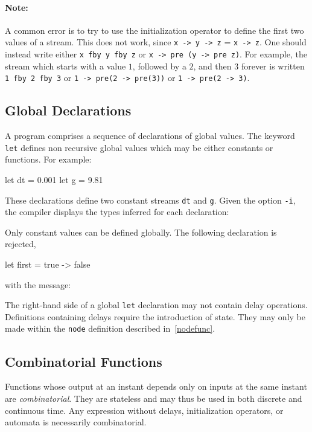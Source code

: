 \documentclass[11pt,titlepage,twoside]{report}
\newcommand{\zls}[1]{\texttt{#1}}
\newenvironment{sample}
  {\begin{flushright}\begin{minipage}[t]{15.3cm}\begin{alltt}\small}
  {\end{alltt}\end{minipage}\end{flushright}}
\begin{document}
\paragraph{Note:} A common error is to try to use the initialization 
operator to define the first two values of a
stream. This does not work, since \zls{x -> y -> z} =
\zls{x -> z}. One should instead write either \zls{x fby y fby z} or
\zls{x -> pre (y -> pre z)}.
For example, the stream which starts with a value
$1$, followed by a $2$, and then $3$ forever is written \zls{1 fby 2 fby 3}
or \mbox{\zls{1 -> pre(2 -> pre(3))}} or \zls{1 -> pre(2 -> 3)}.

\subsection{Global Declarations\label{globaldecl}} %

A program comprises a sequence of declarations of global
values. The keyword \zls{let} defines non recursive global values which may
be either constants or functions. For example:
\begin{chklisting}
let dt = 0.001
let g = 9.81
\end{chklisting}
These declarations define two constant streams \zls{dt} and
\zls{g}.
Given the option \texttt{-i}, the compiler displays the types inferred for 
each declaration:
\begin{sample}\chklistingcmd\end{sample}
\chklistingmsg{}
Only constant values can be defined globally.
The following declaration is rejected,
\begin{chklisting}[fail]
let first = true -> false
\end{chklisting}
with the message:
\begin{sample}\chklistingcmd\end{sample}
\chklistingerr{}
The right-hand side of a global \zls{let} declaration may not contain delay 
operations. Definitions containing delays require the introduction of state.
They may only be made within the \zls{node} definition described 
in~\cref{nodefunc}.

\subsection{Combinatorial Functions\label{combfunc}} %

Functions whose output at an instant depends only on inputs at the same 
instant are \emph{combinatorial}.
They are stateless and may thus be used in both discrete and continuous 
time.
Any expression without delays, initialization operators, or automata is 
necessarily combinatorial.
\end{document}
